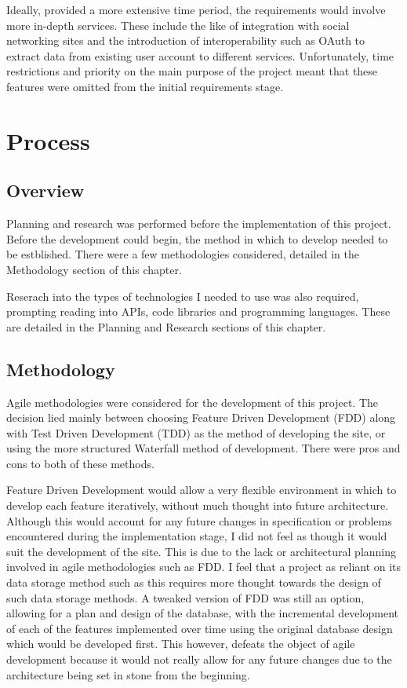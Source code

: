 Ideally, provided a more extensive time period, the requirements would involve more in-depth services. These include the like of integration with social networking sites and the introduction of interoperability such as OAuth\cite{outh} to extract data from existing user account to different services. Unfortunately, time restrictions and priority on the main purpose of the project meant that these features were omitted from the initial requirements stage.

\section{Process}
\subsection{Overview}
Planning and research was performed before the implementation of this project. Before the development could begin, the method in which to develop needed to be estblished. There were a few methodologies considered, detailed in the Methodology section of this chapter.

Reserach into the types of technologies I needed to use was also required, prompting reading into APIs, code libraries and programming languages. These are detailed in the Planning and Research sections of this chapter.

\subsection{Methodology}
Agile methodologies were considered for the development of this project. The decision lied mainly between choosing Feature Driven Development (FDD) along with Test Driven Development (TDD) as the method of developing the site, or using the more structured Waterfall method of development. There were pros and cons to both of these methods. 

Feature Driven Development would allow a very flexible environment in which to develop each feature iteratively, without much thought into future architecture. Although this would account for any future changes in specification or problems encountered during the implementation stage, I did not feel as though it would suit the development of the site. This is due to the lack or architectural planning involved in agile methodologies such as FDD. I feel that a project as reliant on its data storage method such as this requires more thought towards the design of such data storage methods. A tweaked version of FDD was still an option, allowing for a plan and design of the database, with the incremental development of each of the features implemented over time using the original database design which would be developed first. This however, defeats the object of agile development because it would not really allow for any future changes due to the architecture being set in stone from the beginning.

